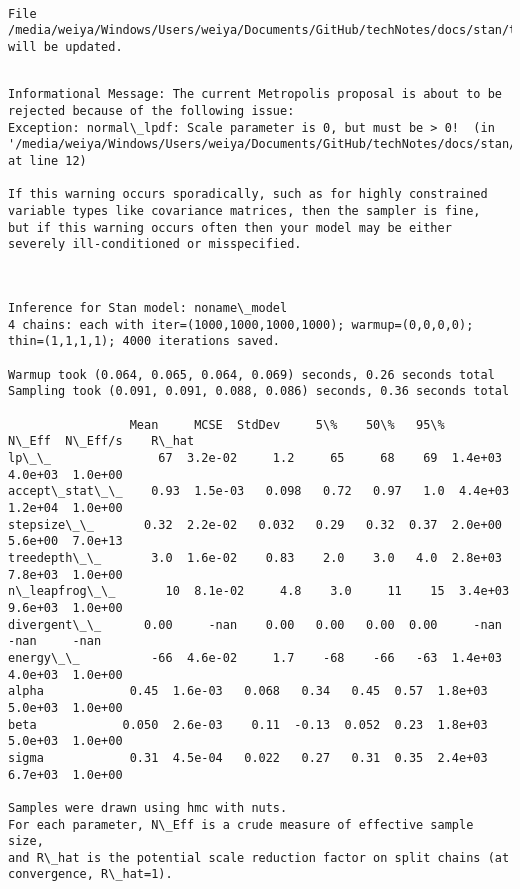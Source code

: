 \documentclass[11pt]{article}
\begin{document}
    \begin{Verbatim}[commandchars=\\\{\}]

File /media/weiya/Windows/Users/weiya/Documents/GitHub/techNotes/docs/stan/tmp/noname.stan will be updated.


    \end{Verbatim}

    \begin{Verbatim}[commandchars=\\\{\}]
Informational Message: The current Metropolis proposal is about to be rejected because of the following issue:
Exception: normal\_lpdf: Scale parameter is 0, but must be > 0!  (in '/media/weiya/Windows/Users/weiya/Documents/GitHub/techNotes/docs/stan/tmp/noname.stan' at line 12)

If this warning occurs sporadically, such as for highly constrained variable types like covariance matrices, then the sampler is fine,
but if this warning occurs often then your model may be either severely ill-conditioned or misspecified.


    \end{Verbatim}

    \begin{Verbatim}[commandchars=\\\{\}]

Inference for Stan model: noname\_model
4 chains: each with iter=(1000,1000,1000,1000); warmup=(0,0,0,0); thin=(1,1,1,1); 4000 iterations saved.

Warmup took (0.064, 0.065, 0.064, 0.069) seconds, 0.26 seconds total
Sampling took (0.091, 0.091, 0.088, 0.086) seconds, 0.36 seconds total

                 Mean     MCSE  StdDev     5\%    50\%   95\%    N\_Eff  N\_Eff/s    R\_hat
lp\_\_               67  3.2e-02     1.2     65     68    69  1.4e+03  4.0e+03  1.0e+00
accept\_stat\_\_    0.93  1.5e-03   0.098   0.72   0.97   1.0  4.4e+03  1.2e+04  1.0e+00
stepsize\_\_       0.32  2.2e-02   0.032   0.29   0.32  0.37  2.0e+00  5.6e+00  7.0e+13
treedepth\_\_       3.0  1.6e-02    0.83    2.0    3.0   4.0  2.8e+03  7.8e+03  1.0e+00
n\_leapfrog\_\_       10  8.1e-02     4.8    3.0     11    15  3.4e+03  9.6e+03  1.0e+00
divergent\_\_      0.00     -nan    0.00   0.00   0.00  0.00     -nan     -nan     -nan
energy\_\_          -66  4.6e-02     1.7    -68    -66   -63  1.4e+03  4.0e+03  1.0e+00
alpha            0.45  1.6e-03   0.068   0.34   0.45  0.57  1.8e+03  5.0e+03  1.0e+00
beta            0.050  2.6e-03    0.11  -0.13  0.052  0.23  1.8e+03  5.0e+03  1.0e+00
sigma            0.31  4.5e-04   0.022   0.27   0.31  0.35  2.4e+03  6.7e+03  1.0e+00

Samples were drawn using hmc with nuts.
For each parameter, N\_Eff is a crude measure of effective sample size,
and R\_hat is the potential scale reduction factor on split chains (at 
convergence, R\_hat=1).


    \end{Verbatim}
\end{document}

